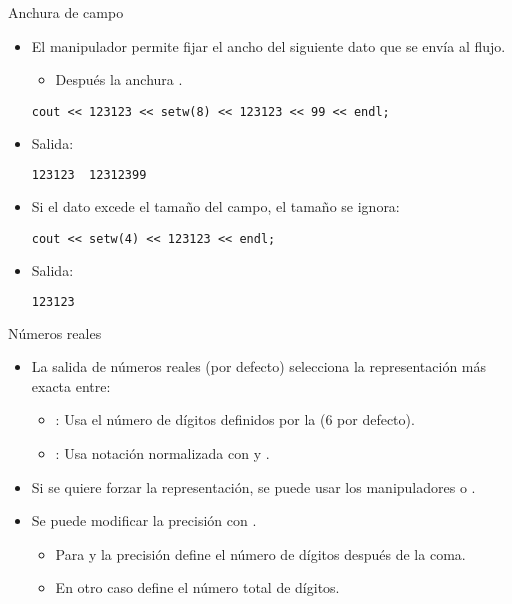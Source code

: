 \begin{frame}[t,fragile]{Anchura de campo}
\begin{itemize}
  \item El manipulador  permite fijar el ancho del siguiente dato que se envía al flujo.
    \begin{itemize}
      \item Después la anchura .
    \end{itemize}
\begin{lstlisting}
cout << 123123 << setw(8) << 123123 << 99 << endl;
\end{lstlisting}

  \item Salida:
\begin{lstlisting}[language=bash]
123123  12312399
\end{lstlisting}

  \item Si el dato excede el tamaño del campo, el tamaño se ignora:
\begin{lstlisting}
cout << setw(4) << 123123 << endl;
\end{lstlisting}

  \item Salida:
\begin{lstlisting}[language=bash]
123123
\end{lstlisting}
\end{itemize}
\end{frame}

\begin{frame}[t]{Números reales}
\begin{itemize}
  \item La salida de números reales (por defecto) selecciona la representación más exacta entre:
    \begin{itemize}
      \item {}: 
            Usa el número de dígitos definidos por la  (6 por defecto).
      \item {}: 
            Usa notación normalizada con  y .
    \end{itemize}

  \item Si se quiere forzar la representación, se puede usar los manipuladores 
        o .

  \item Se puede modificar la precisión con .
    \begin{itemize}
      \item Para  y  la precisión define el número de dígitos después de la coma.
      \item En otro caso define el número total de dígitos.
    \end{itemize}
\end{itemize}
\end{frame}

